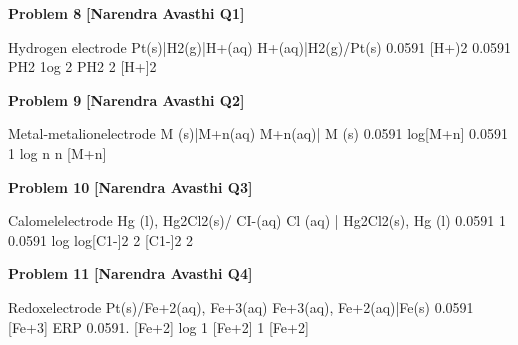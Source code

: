 \begin{problembox}
\textbf{Problem 8} \hfill \textbf{[Narendra Avasthi Q1]}
\label{q:ext-narendra_avasthi_all_questions-8}

Hydrogen electrode
Pt(s)|H2(g)|H+(aq)
H+(aq)|H2(g)/Pt(s)
0.0591
[H+)2
0.0591
PH2
1og
2
PH2
2
[H+]2
\end{problembox}

\begin{problembox}
\textbf{Problem 9} \hfill \textbf{[Narendra Avasthi Q2]}
\label{q:ext-narendra_avasthi_all_questions-9}

Metal-metalionelectrode
M (s)|M+n(aq)
M+n(aq)| M (s)
0.0591
log[M+n]
0.0591
1
log
n
n
[M+n]
\end{problembox}

\begin{problembox}
\textbf{Problem 10} \hfill \textbf{[Narendra Avasthi Q3]}
\label{q:ext-narendra_avasthi_all_questions-10}

Calomelelectrode
Hg (l), Hg2Cl2(s)/ CI-(aq)
Cl (aq) | Hg2Cl2(s), Hg (l)
0.0591
1
0.0591
log
log[C1-]$2$
2
[C1-]$2$
2
\end{problembox}

\begin{problembox}
\textbf{Problem 11} \hfill \textbf{[Narendra Avasthi Q4]}
\label{q:ext-narendra_avasthi_all_questions-11}

Redoxelectrode
Pt(s)/Fe+2(aq), Fe+3(aq)
Fe+3(aq), Fe+2(aq)|Fe(s)
0.0591
[Fe+3]
ERP
0.0591.
[Fe+2]
log
1
[Fe+2]
1
[Fe+2]
\end{problembox}

